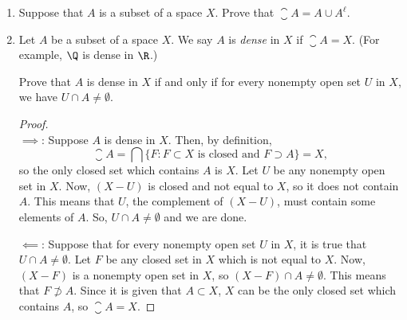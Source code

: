 \documentclass[letterpaper]{article}
\begin{document}
\begin{enumerate}
\begin{proof}
Since $x$ is a limit point of $A$, then $A\cap(U_x-\{x\})\neq\emptyset$, so $U_x$ contains at least one element of $A$ distinct from $x$, which contradicts our construction of $U_x$. Therefore, every open set $U$ contains infinitely many points of $A$. 
\end{proof}

\item Suppose that $A$ is a subset of a space $X$. Prove that $\closure{A} = A\cup A^\ell$. 

\item Let $A$ be a subset of a space $X$. We say $A$ is \emph{dense} in $X$ if $\closure{A} = X$. (For example, $\Q$ is dense in $\R$.)\

Prove that $A$ is dense in $X$ if and only if for every nonempty open set $U$ in $X$, we have $U\cap A \neq \emptyset$.

\begin{proof}\mbox{}\\
$\implies$: Suppose $A$ is dense in $X$. Then, by definition, 
$$\closure{A} = \bigcap\{F: F\subset X\text{ is closed and } F \supset A\} = X,$$
so the only closed set which contains $A$ is $X$. Let $U$ be any nonempty open set in $X$. Now, $(X-U)$ is closed and not equal to $X$, so it does not contain $A$. This means that $U$, the complement of $(X-U)$, must contain some elements of $A$. So, $U\cap A\neq\emptyset$ and we are done. 

$\impliedby$: Suppose that for every nonempty open set $U$ in $X$, it is true that $U\cap A \neq \emptyset$. Let $F$ be any closed set in $X$ which is not equal to $X$. Now, $(X-F)$ is a nonempty open set in $X$, so $(X-F)\cap A\neq\emptyset$. This means that $F\not\supset A$. Since it is given that $A\subset X$, $X$ can be the only closed set which contains $A$, so $\closure{A}=X$. 
\end{proof}

\end{enumerate}
\end{document}
